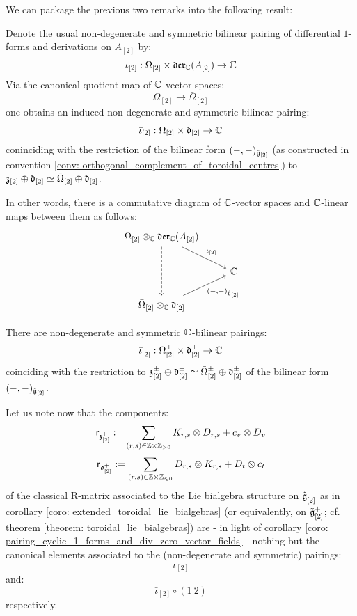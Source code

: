         We can package the previous two remarks into the following result:
        \begin{proposition} \label{prop: pairing_cyclic_1_forms_and_div_zero_vector_fields} 
            Denote the usual non-degenerate and symmetric bilinear pairing of differential $1$-forms and derivations on $A_{[2]}$ by:
                $$\iota_{[2]}: \Omega_{[2]} \x \der_{\bbC}(A_{[2]}) \to \bbC$$
            Via the canonical quotient map of $\mathbb{C}$-vector spaces:
                $$\Omega_{[2]} \to \bar{\Omega}_{[2]}$$
            one obtains an induced non-degenerate and symmetric bilinear pairing:
                $$\bar{\iota}_{[2]}: \bar{\Omega}_{[2]} \x \d_{[2]} \to \bbC$$
            coninciding with the restriction of the bilinear form $(-, -)_{\hat{\mathfrak{g}}_{[2]}}$ (as constructed in convention \ref{conv: orthogonal_complement_of_toroidal_centres}) to $\mathfrak{z}_{[2]} \oplus \mathfrak{d}_{[2]} \simeq \bar{\Omega}_{[2]} \oplus \mathfrak{d}_{[2]}$.
            
            In other words, there is a commutative diagram of $\mathbb{C}$-vector spaces and $\mathbb{C}$-linear maps between them as follows:
                $$
                    \begin{tikzcd}
                	{\Omega_{[2]} \tensor_{\bbC} \der_{\bbC}(A_{[2]})} \\
                	& \bbC \\
                	{\bar{\Omega}_{[2]} \tensor_{\bbC} \d_{[2]}}
                	\arrow[dashed, from=1-1, to=3-1]
                	\arrow["{\iota_{[2]}}", from=1-1, to=2-2]
                	\arrow["{(-, -)_{\hat{\g}_{[2]}}}"', from=3-1, to=2-2]
                    \end{tikzcd}
                $$
        \end{proposition}
        \begin{corollary} \label{coro: pairing_cyclic_1_forms_and_div_zero_vector_fields}
            There are non-degenerate and symmetric $\mathbb{C}$-bilinear pairings:
                $$\bar{\iota}_{[2]}^{\pm}: \bar{\Omega}_{[2]}^{\pm} \x \d_{[2]}^{\pm} \to \bbC$$
            coinciding with the restriction to $\mathfrak{z}_{[2]}^{\pm} \oplus \mathfrak{d}_{[2]}^{\pm} \simeq \bar{\Omega}_{[2]}^{\pm} \oplus \mathfrak{d}_{[2]}^{\pm}$ of the bilinear form $(-, -)_{\hat{\mathfrak{g}}_{[2]}}$. 
        \end{corollary}
        Let us note now that the components:
            $$\sfr_{\z_{[2]}^+} := \sum_{(r, s) \in \Z \x \Z_{> 0}} K_{r, s} \tensor D_{r, s} + c_v \tensor D_v$$
            $$\sfr_{\d_{[2]}^+} := \sum_{(r, s) \in \Z \x \Z_{\leq 0}} D_{r, s} \tensor K_{r, s} + D_t \tensor c_t$$
        of the classical R-matrix associated to the Lie bialgebra structure on $\hat{\mathfrak{g}}_{[2]}^+$ as in corollary \ref{coro: extended_toroidal_lie_bialgebras} (or equivalently, on $\tilde{\mathfrak{g}}_{[2]}^+$; cf. theorem \ref{theorem: toroidal_lie_bialgebras}) are - in light of corollary \ref{coro: pairing_cyclic_1_forms_and_div_zero_vector_fields} - nothing but the canonical elements associated to the (non-degenerate and symmetric) pairings:
            $$\bar{\iota}_{[2]}$$
        and:
            $$\bar{\iota}_{[2]} \circ (1 \: 2)$$
        respectively. 
        
